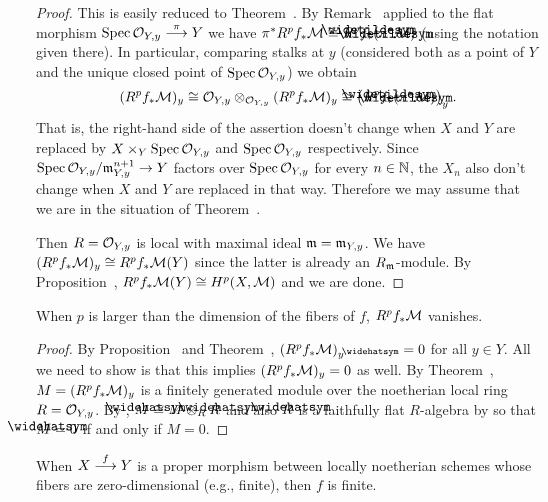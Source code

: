 \documentclass[a4paper,parskip=half,numbers=enddot, DIV=12]{scrreprt}
\begin{document}
\begin{proof}
	This is easily reduced to Theorem~. By Remark~ applied to the flat morphism $\Spec \Oo_{Y,y}\morphism[\pi]Y$ we have $\pi^*R^pf_*\Mm\cong R^p\snake{f}_*(\snake{\pi}^*\Mm)$ (using the notation given there). In particular, comparing stalks at $y$ (considered both as a point of $Y$ and the unique closed point of $\operatorname{Spec} \mathcal{O}_{Y,y}$) we obtain
	\begin{align*}
		(R^pf_*\Mm)_y\cong \Oo_{Y,y}\otimes_{\Oo_{Y,y}}(R^pf_*\Mm)_y\cong \big(R^p\snake{f}_*(\snake{\pi}^*\Mm)\big)_y\;.
	\end{align*}
	That is, the right-hand side of the assertion doesn't change when $X$ and $Y$ are replaced by $X\times_Y\operatorname{Spec}\mathcal{O}_{Y,y}$ and $\operatorname{Spec} \mathcal{O}_{Y,y}$ respectively. Since $\Spec \Oo_{Y,y}/\mm_{Y,y}^{n+1}\morphism Y$ factors over $\operatorname{Spec} \mathcal{O}_{Y,y}$ for every $n\in\mathbb{N}$, the $X_n$ also don't change when $X$ and $Y$ are replaced in that way. Therefore we may assume that we are in the situation of Theorem~.
	
	Then $R=\mathcal{O}_{Y,y}$ is local with maximal ideal $\mathfrak{m}=\mathfrak{m}_{Y,y}$. We have $(R^pf_*\mathcal{M})_y\cong R^pf_*\mathcal{M}(Y)$ since the latter is already an $R_{\mathfrak{m}}$-module. By Proposition~, $R^pf_*\mathcal{M}(Y)\cong H^p(X,\mathcal{M})$ and we are done.
\end{proof}
\begin{cor}
	When $p$ is larger than the dimension of the fibers of $f$, $R^pf_*\mathcal{M}$ vanishes.
\end{cor}
\begin{proof}
	By Proposition~ and Theorem~, $(R^pf_*\Mm)_y^\complete=0$ for all $y\in Y$. All we need to show is that this implies $(R^pf_*\mathcal{M})_y=0$ as well. By Theorem~, $M=(R^pf_*\mathcal{M})_y$ is a finitely generated module over the noetherian local ring $R=\mathcal{O}_{Y,y}$. By \cite[Theorem~7.2a]{eisenbudCommAlg}, $\roof{M}\cong M\otimes_R\roof{R}$ and also $\roof{R}$ is a faithfully flat $R$-algebra by \cite[]{stacks-project} so that $\roof{M}=0$ if and only if $M=0$.
\end{proof}
\begin{cor}
	When $X\morphism[f]Y$ is a proper morphism between locally noetherian schemes whose fibers are zero-dimensional (e.g., finite), then $f$ is finite.
\end{cor}
\end{document}
